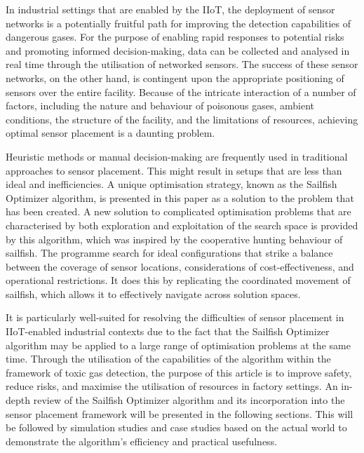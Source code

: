 \documentclass[conference]{IEEEtran}
\begin{document}
In industrial settings that are enabled by the IIoT, the deployment of sensor networks is a potentially fruitful path for improving the detection capabilities of dangerous gases. For the purpose of enabling rapid responses to potential risks and promoting informed decision-making, data can be collected and analysed in real time through the utilisation of networked sensors\cite{aldweesh2024mlora}. The success of these sensor networks, on the other hand, is contingent upon the appropriate positioning of sensors over the entire facility. Because of the intricate interaction of a number of factors, including the nature and behaviour of poisonous gases, ambient conditions, the structure of the facility, and the limitations of resources, achieving optimal sensor placement is a daunting problem\cite{khorramifar2023environmental}.

Heuristic methods\cite{pabitha2024chameleon,kaladevi2023breast} or manual decision-making are frequently used in traditional approaches to sensor placement. This might result in setups that are less than ideal and inefficiencies. A unique optimisation strategy, known as the Sailfish Optimizer algorithm\cite{kumar2023sailfish}, is presented in this paper as a solution to the problem that has been created. A new solution to complicated optimisation problems that are characterised by both exploration and exploitation of the search space is provided by this algorithm, which was inspired by the cooperative hunting behaviour of sailfish. The programme search for ideal configurations that strike a balance between the coverage of sensor locations, considerations of cost-effectiveness, and operational restrictions. It does this by replicating the coordinated movement of sailfish, which allows it to effectively navigate across solution spaces\cite{madhavi2023hybrid,rajoriya2023sailfish}.

It is particularly well-suited for resolving the difficulties of sensor placement in IIoT-enabled industrial contexts due to the fact that the Sailfish Optimizer algorithm may be applied to a large range of optimisation problems at the same time. Through the utilisation of the capabilities of the algorithm within the framework of toxic gas detection, the purpose of this article is to improve safety, reduce risks, and maximise the utilisation of resources in factory settings. An in-depth review of the Sailfish Optimizer algorithm and its incorporation into the sensor placement framework will be presented in the following sections. This will be followed by simulation studies and case studies based on the actual world to demonstrate the algorithm's efficiency and practical usefulness.
\end{document}
